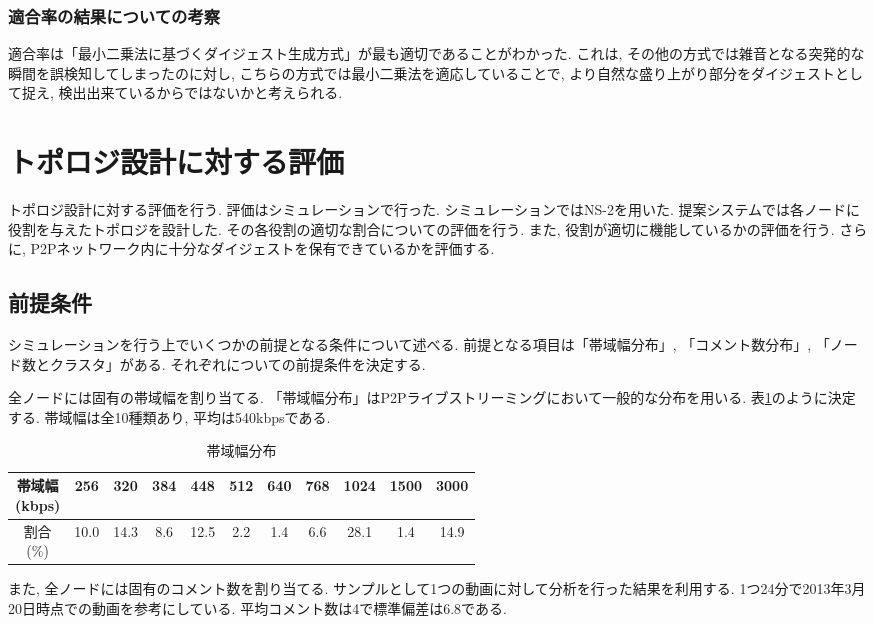 \subsubsection{適合率の結果についての考察}
適合率は「最小二乗法に基づくダイジェスト生成方式」が最も適切であることがわかった. これは, その他の方式では雑音となる突発的な瞬間を誤検知してしまったのに対し, こちらの方式では最小二乗法を適応していることで, より自然な盛り上がり部分をダイジェストとして捉え, 検出出来ているからではないかと考えられる.

\section{トポロジ設計に対する評価}
トポロジ設計に対する評価を行う. 評価はシミュレーションで行った. シミュレーションではNS-2を用いた. 提案システムでは各ノードに役割を与えたトポロジを設計した. その各役割の適切な割合についての評価を行う. また, 役割が適切に機能しているかの評価を行う. さらに, P2Pネットワーク内に十分なダイジェストを保有できているかを評価する.

\subsection{前提条件}
シミュレーションを行う上でいくつかの前提となる条件について述べる. 前提となる項目は「帯域幅分布」, 「コメント数分布」, 「ノード数とクラスタ」がある. それぞれについての前提条件を決定する.

全ノードには固有の帯域幅を割り当てる. 「帯域幅分布」はP2Pライブストリーミングにおいて一般的な分布\cite{band-dist}を用いる. 表\ref{tbl:band-dist}のように決定する. 帯域幅は全10種類あり, 平均は540kbpsである.

\begin{table}[h]
  \caption{帯域幅分布}
  \label{tbl:band-dist}
  \centering
      {\small
        \begin{tabular}{|c|c|c|c|c|c|c|c|c|c|c|} \hline
          \shortstack{帯域幅 \\ (kbps)} & 256 & 320 & 384 & 448 & 512 & 640 & 768 & 1024 & 1500 & 3000 \\ \hline
          \shortstack{割合 \\ (\%)} & 10.0 & 14.3 & 8.6 & 12.5 & 2.2 & 1.4 & 6.6 & 28.1 & 1.4 & 14.9 \\ \hline
        \end{tabular}
      }
\end{table}

また, 全ノードには固有のコメント数を割り当てる. サンプルとして1つの動画に対して分析を行った結果を利用する\cite{comment}. 1つ24分で2013年3月20日時点での動画を参考にしている. 平均コメント数は4で標準偏差は6.8である.

